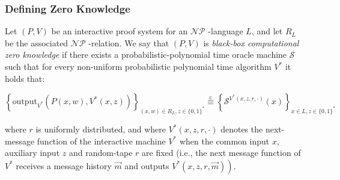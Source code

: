 \documentclass{beamer}
\begin{document}
    \begin{frame}
        \frametitle{Defining Zero Knowledge}
        \begin{definition}[bb-cZK]
            Let $(P, V)$ be an interactive proof system for an $\mathcal{N} \mathcal{P}$ -language $L$, and let $R_{L}$ be the associated $\mathcal{N} \mathcal{P}$ -relation. We say that $(P, V)$ is \emph{black-box computational zero knowledge} if there exists a probabilistic-polynomial time oracle machine $\mathcal{S}$ such that for every non-uniform probabilistic polynomial time algorithm $V^{*}$ it holds that:

            $$
            \left\{\text {output}_{V^{*}}\left(P(x, w), V^{*}(x, z)\right)\right\}_{(x, w) \in R_{L}, z \in\{0,1\}^{*}} \stackrel{\mathrm{c}}{\equiv}\left\{\mathcal{S}^{V^{*}(x, z, r, \cdot)}(x)\right\}_{x \in L, z \in\{0,1\}^{*}}
            $$

            where $r$ is uniformly distributed, and where $V^{*}(x, z, r, \cdot)$ denotes the next-message function of the interactive machine $V^{*}$ when the common input $x$, auxiliary input $z$ and random-tape $r$ are fixed (i.e., the next message function of $V^{*}$ receives a message history $\vec{m}$ and outputs $\left.V^{*}(x, z, r, \vec{m})\right)$.
            
        \end{definition}
    
        
    
    \end{frame}
\end{document}
